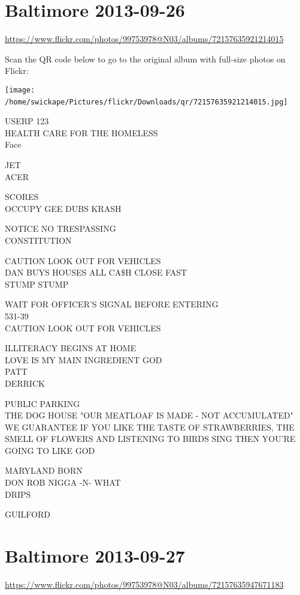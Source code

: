 \documentclass[10pt,letterpaper]{article}
\begin{document}
\section*{Baltimore 2013-09-26}

\url{https://www.flickr.com/photos/99753978@N03/albums/72157635921214015}

Scan the QR code below to go to the original album with full-size photos on Flickr:

\texttt{[image: /home/swickape/Pictures/flickr/Downloads/qr/72157635921214015.jpg]}
\

USERP 123\\
HEALTH CARE FOR THE HOMELESS\\
Face

JET\\
ACER

SCORES\\
OCCUPY GEE DUBS KRASH

NOTICE NO TRESPASSING\\
CONSTITUTION

CAUTION LOOK OUT FOR VEHICLES\\
DAN BUYS HOUSES ALL CA\$H CLOSE FAST\\
STUMP STUMP

WAIT FOR OFFICER'S SIGNAL BEFORE ENTERING\\
531{-}39\\
CAUTION LOOK OUT FOR VEHICLES

ILLITERACY BEGINS AT HOME\\
LOVE IS MY MAIN INGREDIENT GOD\\
PATT\\
DERRICK

PUBLIC PARKING\\
THE DOG HOUSE "OUR MEATLOAF IS MADE {-} NOT ACCUMULATED"\\
WE GUARANTEE IF YOU LIKE THE TASTE OF STRAWBERRIES, THE SMELL OF FLOWERS AND LISTENING TO BIRDS SING THEN YOU'RE GOING TO LIKE GOD

MARYLAND BORN\\
DON ROB NIGGA {-}N{-} WHAT\\
DRIPS

GUILFORD
\

\section*{Baltimore 2013-09-27}

\url{https://www.flickr.com/photos/99753978@N03/albums/72157635947671183}
\end{document}
